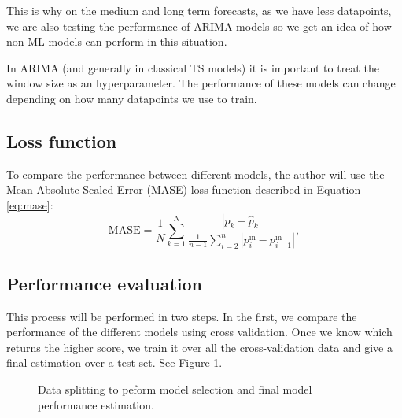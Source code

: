 This is why on the medium and long term forecasts, as we have less datapoints, we are also testing the performance of ARIMA models so we get an idea of how non-ML models can perform in this situation.

In ARIMA (and generally in classical TS models) it is important to treat the window size as an hyperparameter. The performance of these models can change depending on how many datapoints we use to train.

\subsection{Loss function}
To compare the performance between different models, the author will use the Mean Absolute Scaled Error (MASE) loss function described in Equation \ref{eq:mase}:
\begin{equation}
    \label{eq:mase}
    \mathrm{MASE} = \frac{1}{N}\sum_{k=1}^{N}\frac{|p_k-\hat{p}_k|}{\frac{1}{n-1}\sum_{i=2}^{n} |p^\mathrm{in}_i - p^\mathrm{in}_{i-1} |},
\end{equation}

\subsection{Performance evaluation}
This process will be performed in two steps. In the first, we compare the performance of the different models using cross validation. Once we know which returns the higher score, we train it over all the cross-validation data and give a final estimation over a test set. See Figure \ref{fig:cross-train-test}.

\begin{figure}[H]
\centering
    \caption{Data splitting to peform model selection and final model performance estimation.}
    \label{fig:cross-train-test}
\end{figure}

